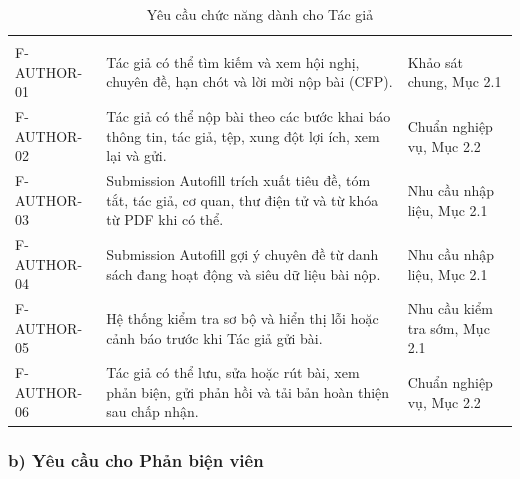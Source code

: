 \begingroup
\setlength{\tabcolsep}{2pt}
\setlength{\LTleft}{0pt plus \textwidth}
\setlength{\LTright}{0pt plus \textwidth}
\begin{longtable}{|C{0.22\textwidth}|P{0.49\textwidth}|P{0.22\textwidth}|}
  \caption{Yêu cầu chức năng dành cho Tác giả}\\
\hline
{} &  &  \\ \hline
\endfirsthead
\hline
{} &  &  \\ \hline
\endhead
\hline
\endfoot
F-AUTHOR-01 & Tác giả có thể tìm kiếm và xem hội nghị, chuyên đề, hạn chót và lời mời nộp bài (CFP). & Khảo sát chung, Mục 2.1 \\ \hline
F-AUTHOR-02 & Tác giả có thể nộp bài theo các bước khai báo thông tin, tác giả, tệp, xung đột lợi ích, xem lại và gửi. & Chuẩn nghiệp vụ, Mục 2.2 \\ \hline
F-AUTHOR-03 & Submission Autofill trích xuất tiêu đề, tóm tắt, tác giả, cơ quan, thư điện tử và từ khóa từ PDF khi có thể. & Nhu cầu nhập liệu, Mục 2.1 \\ \hline
F-AUTHOR-04 & Submission Autofill gợi ý chuyên đề từ danh sách đang hoạt động và siêu dữ liệu bài nộp. & Nhu cầu nhập liệu, Mục 2.1 \\ \hline
F-AUTHOR-05 & Hệ thống kiểm tra sơ bộ và hiển thị lỗi hoặc cảnh báo trước khi Tác giả gửi bài. & Nhu cầu kiểm tra sớm, Mục 2.1 \\ \hline
F-AUTHOR-06 & Tác giả có thể lưu, sửa hoặc rút bài, xem phản biện, gửi phản hồi và tải bản hoàn thiện sau chấp nhận. & Chuẩn nghiệp vụ, Mục 2.2 \\ \hline
\end{longtable}
\endgroup

\subsubsection{b) Yêu cầu cho Phản biện viên}

